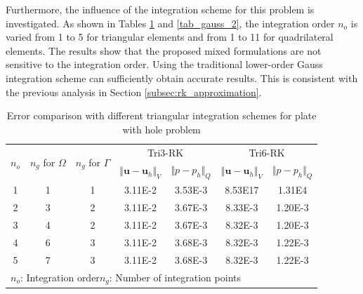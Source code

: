 Furthermore, the influence of the integration scheme for this problem is investigated.
As shown in Tables \ref{tab_gauss_1} and \ref{tab_gauss_2}, the integration order $n_o$ is varied from 1 to 5 for triangular elements and from 1 to 11 for quadrilateral elements.
The results show that the proposed mixed formulations are not sensitive to the integration order.
Using the traditional lower-order Gauss integration scheme can sufficiently obtain accurate results.
This is consistent with the previous analysis in Section \ref{subsec:rk_approximation}.
\begin{table}[!htp]
\centering
\caption{Error comparison with different triangular integration schemes for plate with hole problem}
\label{tab_gauss_1}
\begin{tabular}{ccccccc}
\toprule
\multirow{2}{*}{$n_o$} & \multirow{2}{*}{$n_g$ for $\Omega$} & \multirow{2}{*}{$n_g$ for $\Gamma$} & \multicolumn{2}{c}{Tri3-RK} & \multicolumn{2}{c}{Tri6-RK} \\
\shortstack{} & \shortstack{} & \shortstack{} & $\Vert \boldsymbol u-\boldsymbol u_h \Vert_V$ & $\Vert p-p_h \Vert_Q$ & $\Vert \boldsymbol u-\boldsymbol u_h \Vert_V$ & $\Vert p-p_h \Vert_Q$ \\
\midrule
1 & 1 & 1 & 3.11E-2 & 3.53E-3 & 8.53E17 & 1.31E4 \\
2 & 3 & 2 & 3.11E-2 & 3.67E-3 & 8.33E-3 & 1.20E-3 \\
3 & 4 & 2 & 3.11E-2 & 3.67E-3 & 8.32E-3 & 1.20E-3 \\
4 & 6 & 3 & 3.11E-2 & 3.68E-3 & 8.32E-3 & 1.22E-3 \\
5 & 7 & 3 & 3.11E-2 & 3.68E-3 & 8.32E-3 & 1.22E-3 \\
\multicolumn{7}{l}{\footnotesize{$n_o$: Integration order\quad $n_g$: Number of integration points}} \\
\bottomrule
\end{tabular}
\end{table}

